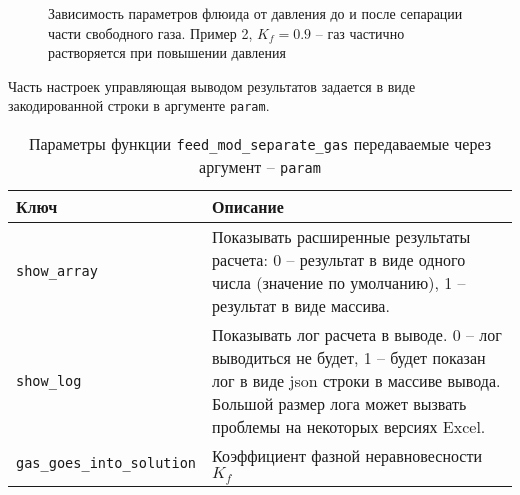 \begin{figure}[H]
\caption{Зависимость параметров флюида от давления до и после сепарации части свободного газа. Пример 2, $K_f=0.9$ -- газ частично растворяется при повышении давления}
\label{ris:separ_gas_plot_2}
\end{figure}


Часть настроек управляющая выводом результатов задается в виде закодированной строки в аргументе \texttt{param}.

\begin{table}[H]
	\caption{Параметры функции \texttt{feed_mod_separate_gas} передаваемые через аргумент -- \texttt{param}}
	\label{table:param_list_feed_med_separation}
	\begin{tabular}{p{}p{}}
		\hline
		Ключ & Описание  \\ \hline
		\texttt{show_array} & Показывать расширенные результаты расчета: 0 -- результат в виде одного числа (значение по умолчанию), 1 -- результат в виде массива.    \\ \hline
		
		\texttt{show_log} & Показывать лог расчета в выводе. 0 -- лог выводиться не будет, 1 -- будет показан лог в виде json строки в массиве вывода. Большой размер лога может вызвать проблемы на некоторых версиях Excel.   \\ \hline
		
		\texttt{gas_goes_into_solution} & Коэффициент фазной неравновесности $K_f$  \\ \hline
		
	\end{tabular}
\end{table}

